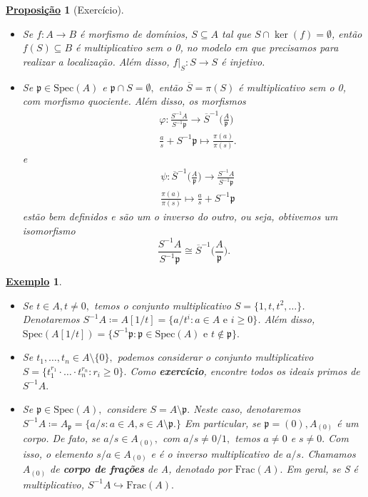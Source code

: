 \documentclass{article}
\newtheorem*{prop*}{\underline{Proposi\c c\~ao}}
\newtheorem{example}{\underline{Exemplo}}
\begin{document}
\begin{prop*}[Exercício]
  \begin{itemize}
    \item[1)] Se \(f:A\rightarrow B\) é morfismo de domínios, \(S\subseteq A\) tal que \(S\cap\ker{(f)} = \emptyset\), então
      \(f(S)\subseteq B\) é multiplicativo sem o 0, no modelo em que precisamos para realizar a localização. Além disso, \(f|_S:S\rightarrow S\) 
      é injetivo.
    \item[2)] Se \(\mathfrak{p}\in \mathrm{Spec}(A)\) e \(\mathfrak{p}\cap S = \emptyset,\) então \(\overline{S} = \pi (S)\) é multiplicativo sem o 0, com
      morfismo quociente. Além disso, os morfismos
      \begin{align*}
  &\varphi :\frac{S^{-1}A}{S^{-1}\mathfrak{p}}\rightarrow \overline{S}^{-1}\biggl(\frac{A}{\mathfrak{p}}\biggr)\\
  &\frac{a}{s}+S^{-1}\mathfrak{p}\mapsto \frac{\pi (a)}{\pi (s)}.
      \end{align*}
      e 
      \begin{align*}
  &\psi:\overline{S}^{-1}\biggl(\frac{A}{\mathfrak{p}}\biggr)\rightarrow \frac{S^{-1}A}{S^{-1}\mathfrak{p}}\\
  &\frac{\pi (a)}{\pi (s)}\mapsto \frac{a}{s} + S^{-1}\mathfrak{p}
      \end{align*}
      estão bem definidos e são um o inverso do outro, ou seja, obtivemos um isomorfismo 
      \[
        \frac{S^{-1}A}{S^{-1}\mathfrak{p}}\cong{\overline{S}^{-1}\biggl(\frac{A}{\mathfrak{p}}\biggr)}.
      \]
  \end{itemize}  
\end{prop*}
\begin{example}
  \begin{itemize}
    \item[1)] Se \(t\in A, t\neq0,\) temos o conjunto multiplicativo \(S=\{1, t, t^{2}, \dotsc\}\).
      Denotaremos \(S^{-1}A\coloneqq A[1/t] = \{a/t^{i}: a\in A \text{ e } i\geq 0\}\). Além disso, 
      \(\mathrm{Spec}(A[1/t]) = \{S^{-1}\mathfrak{p}:\mathfrak{p}\in \mathrm{Spec}(A) \text{ e }t\not\in \mathfrak{p}\}.\)
    \item[2)] Se \(t_{1}, \dotsc, t_{n}\in A\setminus{\{0\}},\) podemos considerar o conjunto multiplicativo \(S = \{t_{1}^{r_{1}}\cdot \dotsc \cdot t_{n}^{r_{n}}: r_{i}\geq 0\}.\)
      Como \textbf{exercício}, encontre todos os ideais primos de \(S^{-1}A.\)
    \item[3)] Se \(\mathfrak{p}\in \mathrm{Spec}(A),\) considere \(S = A\setminus{\mathfrak{p}}.\) Neste caso, denotaremos 
      \(S^{-1}A\coloneqq A_{\mathfrak{p}} = \{a/s: a\in A, s\in A\setminus{\mathfrak{p}}.\}\) Em particular, se \(\mathfrak{p}=(0), A_{(0)}\)
      é um corpo. De fato, se \(a/s\in A_{(0)},\) com \(a/s\neq0/1,\) temos \(a\neq0\) e \(s\neq0.\) Com isso, o elemento
      \(s/a\in A_{(0)}\) e é o inverso multiplicativo de \(a/s\). Chamamos \(A_{(0)}\) de \textbf{corpo de frações} de A,
      denotado por \(\mathrm{Frac}(A).\) Em geral, se S é multiplicativo, \(S^{-1}A\hookrightarrow \mathrm{Frac}(A).\)
  \end{itemize}
\end{example}
\end{document}
